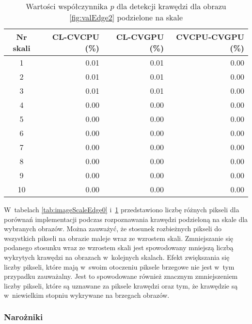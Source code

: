 \begin{center}
\begin{table}
\centering
\caption{Wartości współczynnika $ p $ dla detekcji krawędzi dla obrazu \ref{fig:valEdge2} podzielone na skale}
\label{tab:imageScaleEdge2}
\begin{tabular}{|c|r|r|r|}
 \hline
Nr skali & CL-CVCPU (\%) & CL-CVGPU (\%) & CVCPU-CVGPU (\%) \\ \hline
1        & 0.01     & 0.01     & 0.00        \\ \hline
2        & 0.01     & 0.01     & 0.00        \\ \hline
3        & 0.01     & 0.01     & 0.00        \\ \hline
4        & 0.00     & 0.00     & 0.00        \\ \hline
5        & 0.00     & 0.00     & 0.00        \\ \hline
6        & 0.00     & 0.00     & 0.00        \\ \hline
7        & 0.00     & 0.00     & 0.00        \\ \hline
8        & 0.00     & 0.00     & 0.00        \\ \hline
9        & 0.00     & 0.00     & 0.00        \\ \hline
10       & 0.00     & 0.00     & 0.00        \\ \hline
\end{tabular}
\end{table}
\end{center}

W~tabelach \ref{tab:imageScaleEdge0} i~\ref{tab:imageScaleEdge2} przedstawiono liczbę różnych pikseli dla porównań implementacji podczas rozpoznawania krawędzi podzieloną na skale dla wybranych obrazów. Można zauważyć, że stosunek rozbieżnych pikseli do wszystkich pikseli na obrazie maleje wraz ze wzrostem skali. Zmniejszanie się podanego stosunku wraz ze wzrostem skali jest spowodowany mniejszą liczbą wykrytych krawędzi na obrazach w~kolejnych skalach. Efekt zwiększania się liczby pikseli, które mają w~swoim otoczeniu piksele brzegowe nie jest w~tym przypadku zauważalny. Jest to spowodowane również znacznym zmniejszeniem liczby pikseli, które są uznawane za piksele krawędzi oraz tym, że krawędzie są w~niewielkim stopniu wykrywane na brzegach obrazów.

\subsubsection{Narożniki}
\label{subsubsec:naroznikiTabele}

